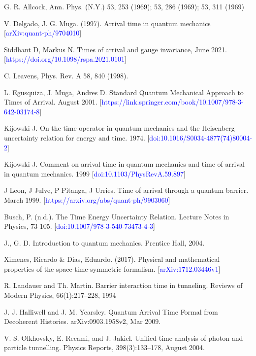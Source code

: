 \newpage
\begin{thebibliography}{0}

 G. R. Allcock, Ann. Phys. (N.Y.) 53, 253 (1969); 53, 286 (1969); 53, 311 (1969)

 V. Delgado, J. G. Muga. (1997). Arrival time in quantum mechanics [\textcolor{blue}{arXiv:quant-ph/9704010}]

 Siddhant D, Markus N. Times of arrival and gauge invariance, June 2021. [\textcolor{blue}{https://doi.org/10.1098/rspa.2021.0101}]

 C. Leavens, Phys. Rev. A 58, 840 (1998).

 L. Egusquiza, J. Muga, Andres D. Standard Quantum Mechanical Approach to Times of Arrival. August 2001. [\textcolor{blue}{https://link.springer.com/book/10.1007/978-3-642-03174-8}]

 Kijowski J. On the time operator in quantum mechanics and the Heisenberg uncertainty relation for energy and time. 1974.  [\textcolor{blue}{doi:10.1016/S0034-4877(74)80004-2}]

 Kijowski J. Comment on arrival time in quantum mechanics and time of arrival in quantum mechanics. 1999 [\textcolor{blue}{doi:10.1103/PhysRevA.59.897}]

 J Leon, J Julve, P Pitanga, J Urries. Time of arrival through a quantum barrier. March 1999. [\textcolor{blue}{https://arxiv.org/abs/quant-ph/9903060}]

 Busch, P. (n.d.). The Time Energy Uncertainty Relation. Lecture Notes in Physics, 73 105. [\textcolor{blue}{doi:10.1007/978-3-540-73473-4-3}] 

 J., G. D. Introduction to quantum mechanics. Prentice Hall, 2004.

 Ximenes, Ricardo \& Dias, Eduardo. (2017). Physical and mathematical properties of the space-time-symmetric formalism. [\textcolor{blue}{arXiv:1712.03446v1}]

 R. Landauer and Th. Martin. Barrier interaction time in tunneling. Reviews of Modern Physics,
66(1):217–228, 1994

 J. J. Halliwell and J. M. Yearsley. Quantum Arrival Time Formal from Decoherent Histories.
arXiv:0903.1958v2, Mar 2009.


 V. S. Olkhovsky, E. Recami, and J. Jakiel. Unified time analysis of photon and particle tunnelling.
Physics Reports, 398(3):133–178, August 2004.


\end{thebibliography}
